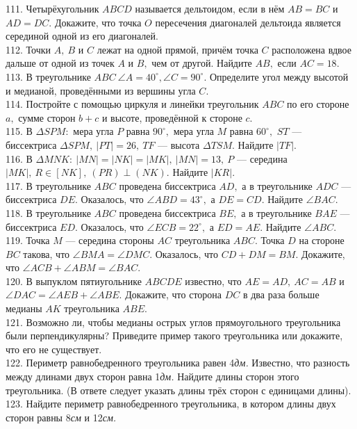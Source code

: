 \documentclass[12pt]{article}
\begin{document}
111. Четырёхугольник $ABCD$ называется дельтоидом, если в нём $AB=BC$ и $AD=DC.$ Докажите, что точка $O$ пересечения диагоналей дельтоида является серединой одной из его диагоналей. \\
112. Точки $A,\ B$ и $C$ лежат на одной прямой, причём точка $C$ расположена вдвое дальше от одной из точек $A$ и $B,$ чем от другой. Найдите $AB,$ если $AC=18.$\\
113. В треугольнике $ABC\ \angle A=40^\circ, \angle C=90^\circ.$ Определите угол между высотой и медианой, проведёнными из вершины угла $C.$\\
114. Постройте с помощью циркуля и линейки треугольник $ABC$ по его стороне $a,$ сумме сторон $b+c$ и высоте, проведённой к стороне $c.$\\
115. В $\Delta SPM:$ мера угла $P$ равна $90^\circ,$ мера угла $M$ равна $60^\circ,$ $ST$ --- биссектриса $\Delta SPM,\ |PT|=26,\ TF$ --- высота $\Delta TSM.$ Найдите $|TF|.$\\
116. В $\Delta MNK:\ |MN|=|NK|=|MK|,\ |MN|=13,\ P$ --- середина $|MK|,\ R\in[NK],\ (PR)\perp(NK).$ Найдите $|KR|.$\\
117. В треугольнике $ABC$ проведена биссектриса $AD,$ а в треугольнике $ADC$ --- биссектриса $DE.$ Оказалось, что $\angle ABD=43^\circ,$ а $DE=CD.$ Найдите $\angle BAC.$\\
118. В треугольнике $ABC$ проведена биссектриса $BE,$ а в треугольнике $BAE$ --- биссектриса $ED.$ Оказалось, что $\angle ECB=22^\circ,$ а $ED=AE.$ Найдите $\angle ABC.$\\
119. Точка $M$ --- середина стороны $AC$ треугольника $ABC.$ Точка $D$ на стороне $BC$ такова, что $\angle BMA=\angle DMC.$ Оказалось, что $CD+DM=BM.$ Докажите, что $\angle ACB+\angle ABM=\angle BAC.$\\
120. В выпуклом пятиугольнике $ABCDE$ известно, что $AE=AD,\ AC=AB$ и $\angle DAC=\angle AEB+\angle ABE.$ Докажите, что сторона $DC$ в два раза больше медианы $AK$ треугольника $ABE.$\\
121. Возможно ли, чтобы медианы острых углов прямоугольного треугольника были перпендикулярны? Приведите пример такого треугольника или докажите, что его не существует.\\
122. Периметр равнобедренного треугольника равен 4{\it дм.} Известно, что разность между длинами двух сторон равна 1{\it дм.} Найдите длины сторон этого треугольника. (В ответе следует указать длины трёх сторон с единицами длины).\\
123. Найдите периметр равнобедренного треугольника, в котором длины двух сторон равны 8{\it см} и 12{\it см.}\\
\end{document}
